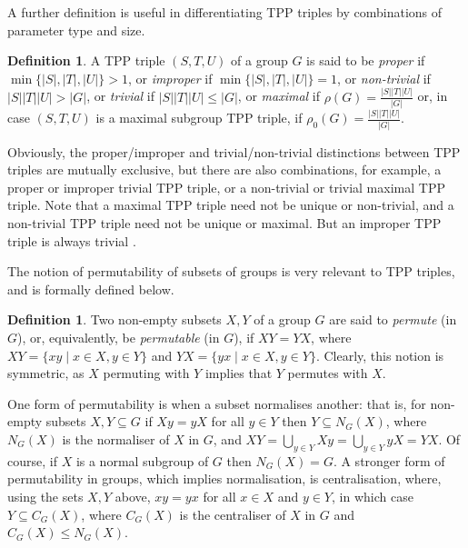 \documentclass{amsart}
\theoremstyle{observation}
\theoremstyle{definition}
\newtheorem{definition}[theorem]{Definition}
\theoremstyle{remark}
\numberwithin{equation}{section}
\begin{document}
A further definition is useful in differentiating TPP triples by combinations of parameter type and size.

\begin{definition}\label{ProperTPP} A TPP triple $(S, T, U)$ of a group $G$ is said to be \emph{proper} if $\min\{|S|, |T|, |U|\} > 1$, or \emph{improper} if $\min\{|S|, |T|, |U|\} = 1$, or \emph{non-trivial} if $|S||T||U| > |G|$, or \emph{trivial} if $|S||T||U| \leq |G|$, or \emph{maximal} if $\rho(G) = \frac{|S||T||U|}{|G|}$ or, in case $(S, T, U)$ is a maximal subgroup TPP triple, if $\rho_0(G) = \frac{|S||T||U|}{|G|}$.
\end{definition}

Obviously, the proper/improper and trivial/non-trivial distinctions between TPP triples are mutually exclusive, but there are also combinations, for example, a proper or improper trivial TPP triple, or a non-trivial or trivial maximal TPP triple. Note that a maximal TPP triple need not be unique or non-trivial, and a non-trivial TPP triple need not be unique or maximal. But an improper TPP triple is always trivial \citep[Proof of Lemma 3.1]{CU}.

\vspace{1mm}

The notion of permutability of subsets of groups is very relevant to TPP triples, and is formally defined below.

\begin{definition} Two non-empty subsets $X, Y$ of a group $G$ are said to \emph{permute} (in $G$), or, equivalently, be \emph{permutable} (in $G$), if $XY = YX$, where $XY = \{xy \mathrel | x \in X, y \in Y\}$ and $YX = \{yx \mathrel | x \in X, y \in Y\}$. Clearly, this notion is symmetric, as $X$ permuting with $Y$ implies that $Y$ permutes with $X$.
\end{definition}

One form of permutability is when a subset normalises another: that is, for non-empty subsets $X, Y \subseteq G$ if $Xy = yX$ for all $y \in Y$ then $Y \subseteq N_G(X)$, where $N_G(X)$ is the normaliser of $X$ in $G$, and $XY = \bigcup_{y \in Y}Xy = \bigcup_{y \in Y}yX = YX$. Of course, if $X$ is a normal subgroup of $G$ then $N_G(X) = G$. A stronger form of permutability in groups, which implies normalisation, is centralisation, where, using the sets $X, Y$ above, $xy = yx$ for all $x \in X$ and $y \in Y$, in which case $Y \subseteq C_G(X)$, where $C_G(X)$ is the centraliser of $X$ in $G$ and $C_G(X) \leq N_G(X)$.
\end{document}
